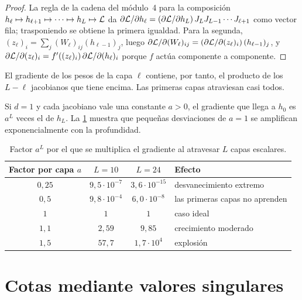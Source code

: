 \begin{proof}
La regla de la cadena del módulo~4 para la composición $h_{\ell}\mapsto h_{\ell+1}\mapsto\cdots\mapsto h_L\mapsto\mathcal{L}$ da $\partial\mathcal{L}/\partial h_\ell=(\partial\mathcal{L}/\partial h_L)\,J_L J_{L-1}\cdots J_{\ell+1}$ como vector fila; trasponiendo se obtiene la primera igualdad. Para la segunda, $(z_\ell)_i=\sum_j (W_\ell)_{ij}(h_{\ell-1})_j$, luego $\partial\mathcal{L}/\partial(W_\ell)_{ij}=(\partial\mathcal{L}/\partial (z_\ell)_i)\,(h_{\ell-1})_j$, y $\partial\mathcal{L}/\partial(z_\ell)_i=f'((z_\ell)_i)\,\partial\mathcal{L}/\partial(h_\ell)_i$ porque $f$ actúa componente a componente.
\end{proof}

El gradiente de los pesos de la capa $\ell$ contiene, por tanto, el producto de los $L-\ell$ jacobianos que tiene encima. Las primeras capas atraviesan casi todos.

\begin{ejemplo}\label{ej:escalar}
Si $d=1$ y cada jacobiano vale una constante $a>0$, el gradiente que llega a $h_0$ es $a^{L}$ veces el de $h_L$. La \cref{tab:factores} muestra que pequeñas desviaciones de $a=1$ se amplifican exponencialmente con la profundidad.
\end{ejemplo}

\begin{table}[h]
\centering
\begin{tabular}{@{}cccl@{}}
\toprule
Factor por capa $a$ & $L=10$ & $L=24$ & Efecto \\
\midrule
$0{,}25$ & $9{,}5\cdot 10^{-7}$ & $3{,}6\cdot 10^{-15}$ & desvanecimiento extremo \\
$0{,}5$ & $9{,}8\cdot 10^{-4}$ & $6{,}0\cdot 10^{-8}$ & las primeras capas no aprenden \\
$1$ & $1$ & $1$ & caso ideal \\
$1{,}1$ & $2{,}59$ & $9{,}85$ & crecimiento moderado \\
$1{,}5$ & $57{,}7$ & $1{,}7\cdot 10^{4}$ & explosión \\
\bottomrule
\end{tabular}
\caption{Factor $a^{L}$ por el que se multiplica el gradiente al atravesar $L$ capas escalares.}
\label{tab:factores}
\end{table}

\section{Cotas mediante valores singulares}

